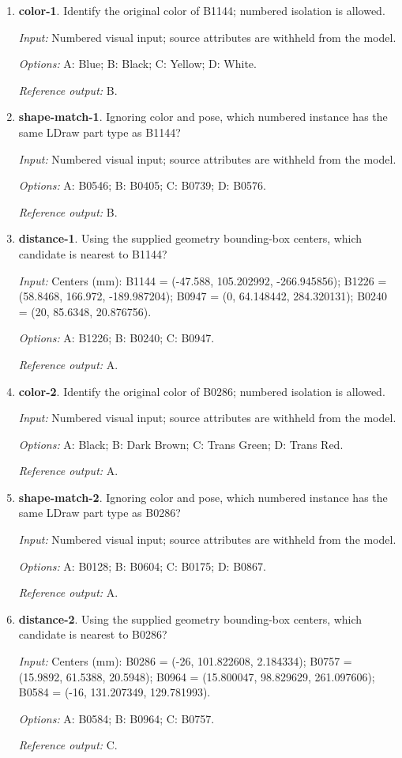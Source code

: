 \begin{enumerate}
\item \textbf{color-1}. Identify the original color of B1144; numbered isolation is allowed.\par {\small \textit{Input:} Numbered visual input; source attributes are withheld from the model. \par\textit{Options:} A: Blue; B: Black; C: Yellow; D: White. \par\textit{Reference output:} B.}
\item \textbf{shape-match-1}. Ignoring color and pose, which numbered instance has the same LDraw part type as B1144?\par {\small \textit{Input:} Numbered visual input; source attributes are withheld from the model. \par\textit{Options:} A: B0546; B: B0405; C: B0739; D: B0576. \par\textit{Reference output:} B.}
\item \textbf{distance-1}. Using the supplied geometry bounding-box centers, which candidate is nearest to B1144?\par {\small \textit{Input:} Centers (mm): B1144 = (-47.588, 105.202992, -266.945856); B1226 = (58.8468, 166.972, -189.987204); B0947 = (0, 64.148442, 284.320131); B0240 = (20, 85.6348, 20.876756). \par\textit{Options:} A: B1226; B: B0240; C: B0947. \par\textit{Reference output:} A.}
\item \textbf{color-2}. Identify the original color of B0286; numbered isolation is allowed.\par {\small \textit{Input:} Numbered visual input; source attributes are withheld from the model. \par\textit{Options:} A: Black; B: Dark Brown; C: Trans Green; D: Trans Red. \par\textit{Reference output:} A.}
\item \textbf{shape-match-2}. Ignoring color and pose, which numbered instance has the same LDraw part type as B0286?\par {\small \textit{Input:} Numbered visual input; source attributes are withheld from the model. \par\textit{Options:} A: B0128; B: B0604; C: B0175; D: B0867. \par\textit{Reference output:} A.}
\item \textbf{distance-2}. Using the supplied geometry bounding-box centers, which candidate is nearest to B0286?\par {\small \textit{Input:} Centers (mm): B0286 = (-26, 101.822608, 2.184334); B0757 = (15.9892, 61.5388, 20.5948); B0964 = (15.800047, 98.829629, 261.097606); B0584 = (-16, 131.207349, 129.781993). \par\textit{Options:} A: B0584; B: B0964; C: B0757. \par\textit{Reference output:} C.}

\end{enumerate}
